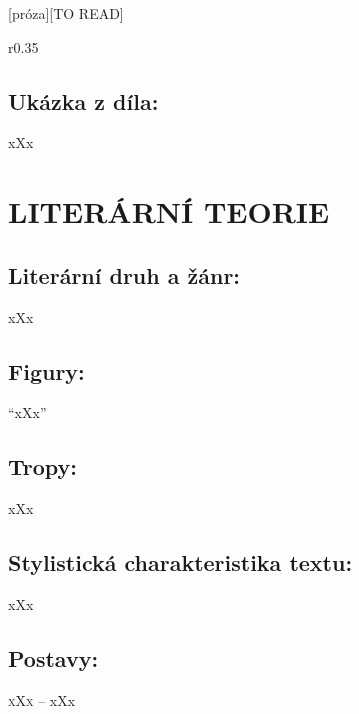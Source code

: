 \documentclass{extarticle} %
\begin{document}
\newpage


\changefontsize{8pt}

[próza][TO READ]

\noindent\begin{wrapfigure}{r}{0.35\textwidth}
\tiny

\subsection*{Ukázka z díla:}
\setlength{\parindent}{3pt}
xXx
\end{wrapfigure}

\section*{LITERÁRNÍ TEORIE}

\subsection*{Literární druh a žánr:}
\noindent xXx



\subsection*{Figury:}
\noindent 
\enquote{xXx}

\subsection*{Tropy:}
\noindent 
xXx

\subsection*{Stylistická charakteristika textu:}
\noindent 
xXx

\subsection*{Postavy:}
\noindent 
\textsc{xXx --} xXx \\
\end{document}
